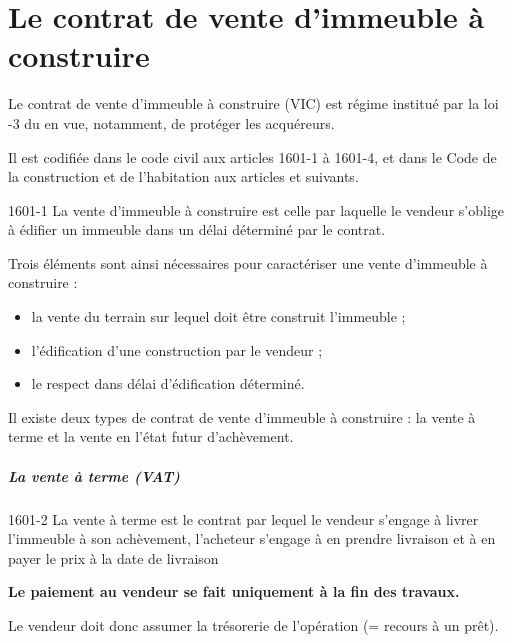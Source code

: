 
\chapter{Le contrat de vente d'immeuble à construire}

Le contrat de vente d'immeuble à construire (VIC) est régime institué par la loi -3 du  en vue, notamment, de protéger les acquéreurs.

Il est codifiée dans le code civil aux articles 1601-1 à 1601-4, et dans le Code de la construction et de l'habitation aux articles  et suivants.

\begin{citationArticleCciv}{1601-1}
	La vente d’immeuble à construire est celle par laquelle le vendeur s’oblige à édifier un immeuble dans un délai déterminé par le contrat.
\end{citationArticleCciv}

\medskip \noindent Trois éléments sont ainsi nécessaires pour caractériser une vente d’immeuble à construire :
\begin{itemize}
	\item la vente du terrain sur lequel doit être construit l’immeuble ;
	\item l’édification d’une construction par le vendeur ;
	\item le respect dans délai d’édification déterminé.
\end{itemize}

\medskip Il existe deux types de contrat de vente d’immeuble à construire : la vente à terme et la vente en l’état futur d’achèvement.

\paragraph{La vente à terme (VAT)}
\begin{citationArticleCciv}{1601-2}
	La vente à terme est le contrat par lequel le vendeur s'engage à livrer l'immeuble à son achèvement, l'acheteur s'engage à en prendre livraison et à en payer le prix à la date de livraison
\end{citationArticleCciv}

\textbf{Le paiement au vendeur se fait uniquement à la fin des travaux.}

Le vendeur doit donc assumer la trésorerie de l’opération (= recours à un prêt).


